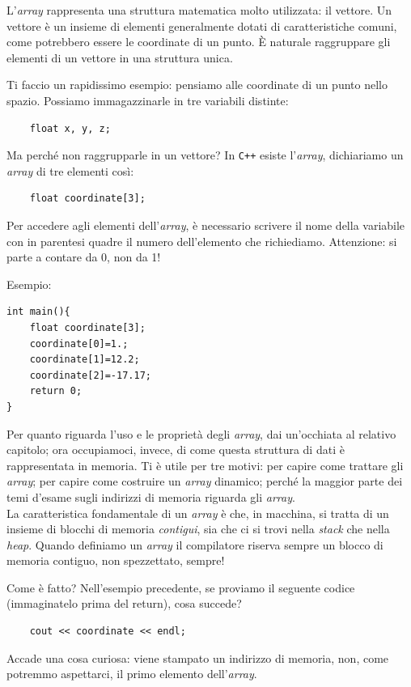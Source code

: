 	L'\emph{array} rappresenta una struttura matematica molto utilizzata: il vettore. Un vettore è un insieme di elementi generalmente dotati di caratteristiche comuni, come potrebbero essere le coordinate di un punto. \`E naturale raggruppare gli elementi di un vettore in una struttura unica. 
	
	Ti faccio un rapidissimo esempio: pensiamo alle coordinate di un punto nello spazio. Possiamo immagazzinarle in tre variabili distinte:
	\begin{lstlisting}
	float x, y, z;
	\end{lstlisting}
	Ma perché non raggrupparle in un vettore? In \verb|C++| esiste l'\emph{array}, dichiariamo un \emph{array} di tre elementi così:
	\begin{lstlisting}
	float coordinate[3];
	\end{lstlisting}
	Per accedere agli elementi dell'\emph{array}, è necessario scrivere il nome della variabile con in parentesi quadre il numero dell'elemento che richiediamo. Attenzione: si parte a contare da 0, non da 1!
	
	Esempio:
\begin{lstlisting}
int main(){
	float coordinate[3];
	coordinate[0]=1.;
	coordinate[1]=12.2;
	coordinate[2]=-17.17;
	return 0;
}
\end{lstlisting}
	Per quanto riguarda l'uso e le proprietà degli \emph{array}, dai un'occhiata al relativo capitolo; ora occupiamoci, invece, di come questa struttura di dati è rappresentata in memoria. Ti è utile per tre motivi: per capire come trattare gli \emph{array}; per capire come costruire un \emph{array} dinamico; perché la maggior parte dei temi d'esame sugli indirizzi di memoria riguarda gli \emph{array}.\\
	
	La caratteristica fondamentale di un \emph{array} è che, in macchina, si tratta di un insieme di blocchi di memoria \emph{contigui}, sia che ci si trovi nella \emph{stack} che nella \emph{heap}. Quando definiamo un \emph{array} il compilatore riserva sempre un blocco di memoria contiguo, non spezzettato, sempre! 
	
	Come è fatto? Nell'esempio precedente, se proviamo il seguente codice (immaginatelo prima del return), cosa succede?
	\begin{lstlisting}
	cout << coordinate << endl;
	\end{lstlisting}
	Accade una cosa curiosa: viene stampato un indirizzo di memoria, non, come potremmo aspettarci, il primo elemento dell'\emph{array}.
	

